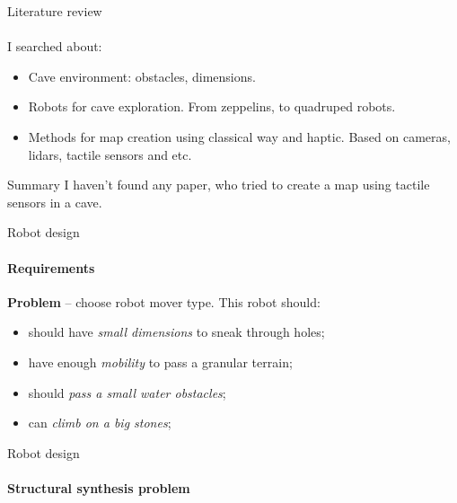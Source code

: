 \documentclass[aspectratio=169]{beamer}
\begin{document}
\begin{frame}[t]{Literature review}
    \framesubtitle{}
    \Large
    I searched about:
    \begin{itemize}
        \item Cave environment: obstacles, dimensions.
        \item Robots for cave exploration. From zeppelins, to quadruped robots.
        \item Methods for map creation using classical way and haptic. Based on cameras, lidars, tactile sensors and etc.
    \end{itemize}
    \begin{block}{Summary}
        I haven't found any paper, who tried to create a map using tactile sensors in a cave.
    \end{block}
\end{frame}

\begin{frame}[t]{Robot design}
    \framesubtitle{Requirements}
    \Large
    \textbf{Problem} --  choose robot mover type. This robot should:
    \begin{itemize}
        \item should have \textit{small dimensions} to sneak through holes;
        \item have enough \textit{mobility} to pass a granular terrain;
        \item should \textit{pass a small water obstacles};
        \item can \textit{climb on a big stones};
    \end{itemize}
\end{frame}

\begin{frame}[t]{Robot design}
    \framesubtitle{Structural synthesis problem}
\end{frame}
\end{document}
